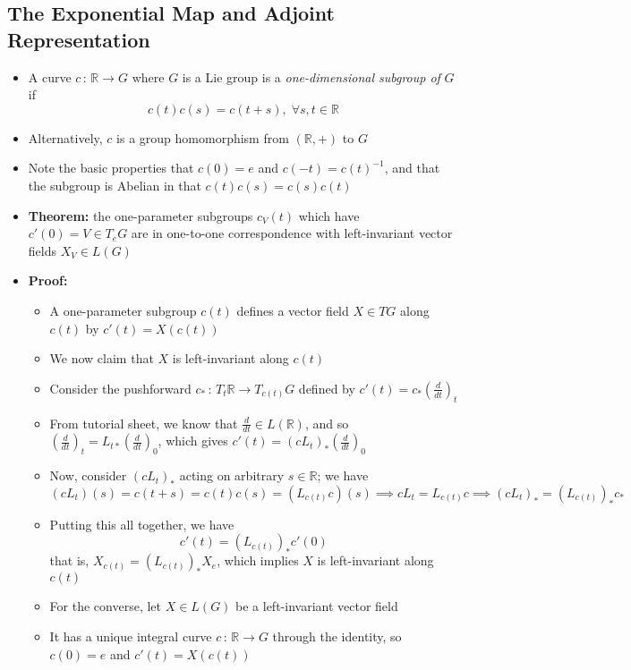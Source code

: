 \documentclass[12pt,a4paper]{article}
\numberwithin{equation}{section}
\begin{document}
	\subsection{The Exponential Map and Adjoint Representation}
	\begin{itemize}
		\item A curve $c\,:\,\mathbb{R}\to G$ where $G$ is a Lie group is a \textit{one-dimensional subgroup of} $G$ if
		\begin{equation}
			c(t)c(s)=c(t+s),\;\forall s,t\in\mathbb{R}
		\end{equation}
		\item Alternatively, $c$ is a group homomorphism from $(\mathbb{R},+)$ to $G$
		\item Note the basic properties that $c(0)=e$ and $c(-t)=c(t)^{-1}$, and that the subgroup is Abelian in that $c(t)c(s)=c(s)c(t)$
		\item \textbf{Theorem:} the one-parameter subgroups $c_{V}(t)$ which have $c'(0)=V\in T_{e}G$ are in one-to-one correspondence with left-invariant vector fields $X_{V}\in L(G)$
		\item \textbf{Proof:}
		\begin{itemize}
			\item A one-parameter subgroup $c(t)$ defines a vector field $X\in TG$ along $c(t)$ by $c'(t)=X(c(t))$
			\item We now claim that $X$ is left-invariant along $c(t)$
			\item Consider the pushforward $c_{*}\,:\,T_{t}\mathbb{R}\to T_{c(t)}G$ defined by $c'(t)=c_{*}\left(\frac{d}{dt}\right)_{t}$
			\item From tutorial sheet, we know that $\frac{d}{dt}\in L(\mathbb{R})$, and so $\left(\frac{d}{dt}\right)_{t}=L_{t*}\left(\frac{d}{dt}\right)_{0}$, which gives $c'(t)=(cL_{t})_{*}\left(\frac{d}{dt}\right)_{0}$
			\item Now, consider $(cL_{t})_{*}$ acting on arbitrary $s\in\mathbb{R}$; we have
			$$
				(cL_{t})(s)=c(t+s)=c(t)c(s)=(L_{c(t)}c)(s)\implies cL_{t}=L_{c(t)}c\implies (cL_{t})_{*}=(L_{c(t)})_{*}c_{*}
			$$
			\item Putting this all together, we have
			$$
				c'(t)=(L_{c(t)})_{*}c'(0)
			$$
			that is, $X_{c(t)}=(L_{c(t)})_{*}X_{e}$, which implies $X$ is left-invariant along $c(t)$
			\item For the converse, let $X\in L(G)$ be a left-invariant vector field
			\item It has a unique integral curve $c\,:\,\mathbb{R}\to G$ through the identity, so $c(0)=e$ and $c'(t)=X(c(t))$

\end{itemize}
\end{itemize}
\end{document}
